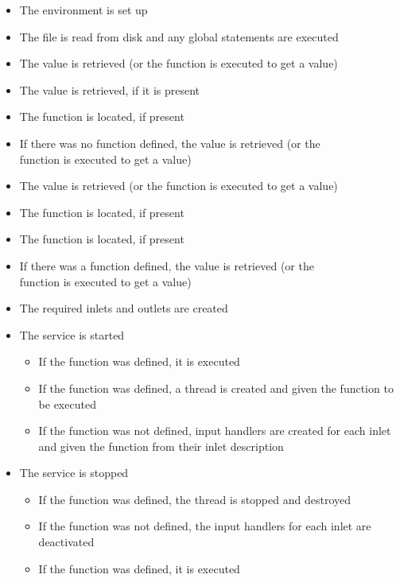\begin{itemize}
\item The \CL{} environment is set up
\item\exSp{}The \CL{} file is read from disk and any global statements are executed
\item\exSp{}The  value is retrieved (or the
 function is executed to get a value)
\item\exSp{}The  value is retrieved, if it is present
\item\exSp{}The  function is located, if present
\item\exSp{}If there was no  function defined, the
 value is retrieved (or the\\
 function is executed to get a value)
\item\exSp{}The  value is retrieved (or the
 function is executed to get a value)
\item\exSp{}The  function is located, if present
\item\exSp{}The  function is located, if present
\item\exSp{}If there was a  function defined, the
 value is retrieved (or the\\
 function is executed to get a value)
\item\exSp{}The required inlets and outlets are created
\item\exSp{}The service is started
\begin{itemize}
\item If the  function was defined, it is executed
\item\exSp{}If the  function was defined, a thread is created and
given the  function to be executed
\item\exSp{}If the  function was not defined, input handlers are
created for each inlet and given the  function from their inlet
description
\end{itemize}
\item\exSp{}The service is stopped
\begin{itemize}
\item If the  function was defined, the thread is stopped and
destroyed
\item\exSp{}If the  function was not defined, the input handlers
for each inlet are deactivated
\item\exSp{}If the  function was defined, it is executed
\end{itemize}
\end{itemize}
\secondaryEnd
\primaryEnd{}
